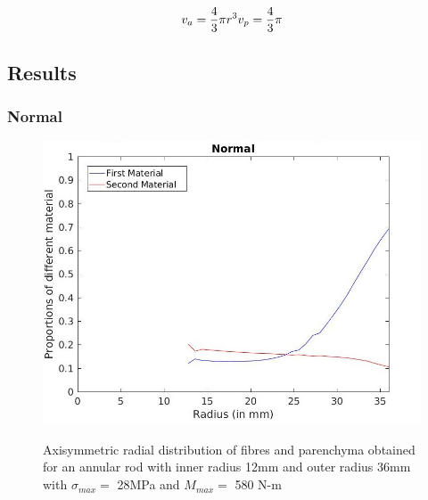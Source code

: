 \documentclass[10pt]{article}
\begin{document}
\begin{equation*}
v_a = \frac{4}{3}\pi r^3\\
v_p = \frac{4}{3}\pi 
\end{equation*}
\subsection{Results}
\subsubsection{Normal}
\begin{figure}[H]
\begin{center}
	\includegraphics[scale=0.35]{./Plots/normal/a77_1.jpg}
	\label{fig:radial}
	\caption{Axisymmetric radial distribution of fibres and parenchyma obtained for an annular rod with inner radius 12mm and outer radius 36mm with $\sigma_{max} = $ 28MPa and $M_{max} = $ 580 N-m}
\end{center}
\end{figure}
\end{document}
